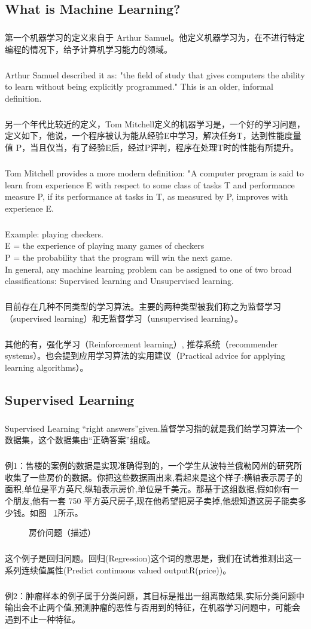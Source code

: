 \documentclass{article}
\begin{document}
\begin{CJK}{UTF8}{gbsn}
\subsection{What is Machine Learning?}
\subparagraph*{}
第一个机器学习的定义来自于 Arthur Samuel。他定义机器学习为，在不进行特定编程的情况下，给予计算机学习能力的领域。
\subparagraph*{}
 Arthur Samuel described it as: "the field of study that gives computers the ability to learn without being explicitly programmed." This is an older, informal definition.
\subparagraph*{}
另一个年代比较近的定义，Tom Mitchell定义的机器学习是，一个好的学习问题，定义如下，他说，一个程序被认为能从经验E中学习，解决任务T，达到性能度量值 P，当且仅当，有了经验E后，经过P评判，程序在处理T时的性能有所提升。
\subparagraph*{}
Tom Mitchell provides a more modern definition: "A computer program is said to learn from experience E with respect to some class of tasks T and performance measure P, if its performance at tasks in T, as measured by P, improves with experience E.
\subparagraph*{}
Example: playing checkers.\\
E = the experience of playing many games of checkers\\
P = the probability that the program will win the next game.\\
In general, any machine learning problem can be assigned to one of two broad classifications:
Supervised learning and Unsupervised learning.\\
\subparagraph*{}
目前存在几种不同类型的学习算法。主要的两种类型被我们称之为监督学习（supervised learning）和无监督学习（unsupervised learning）。
\subparagraph*{}
其他的有，强化学习（Reinforcement learning）, 推荐系统（recommender systems）。也会提到应用学习算法的实用建议（Practical advice for applying learning algorithms）。
\subsection{Supervised Learning}
\subparagraph*{}
Supervised Learning ``right answers''given.监督学习指的就是我们给学习算法一个数据集，这个数据集由“正确答案”组成。
\subparagraph*{}
例1：售楼的案例的数据是实现准确得到的，一个学生从波特兰俄勒冈州的研究所收集了一些房价的数据。你把这些数据画出来,看起来是这个样子:横轴表示房子的面积,单位是平方英尺,纵轴表示房价,单位是千美元。那基于这组数据,假如你有一个朋友,他有一套 750 平方英尺房子,现在他希望把房子卖掉,他想知道这房子能卖多少钱。如图 ~\ref{fig:price}所示。
\begin{figure}[H]
\caption{房价问题（描述）}
\label{fig:price}
\end{figure}
\subparagraph*{}
这个例子是回归问题。回归(Regression)这个词的意思是，我们在试着推测出这一系列连续值属性(Predict continuous valued outputR(price))。
\subparagraph*{}
例2：肿瘤样本的例子属于分类问题，其目标是推出一组离散结果,实际分类问题中输出会不止两个值,预测肿瘤的恶性与否用到的特征，在机器学习问题中，可能会遇到不止一种特征。


\end{CJK}
\end{document}

